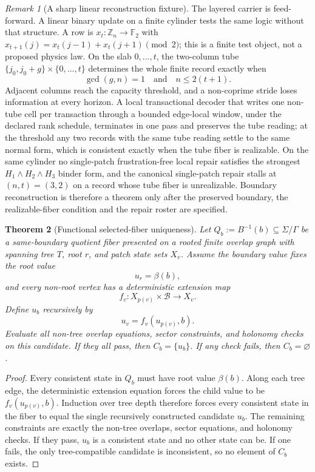 \documentclass[11pt]{article}
\newtheorem{theorem}{Theorem}[section]
\theoremstyle{remark}
\newtheorem{remark}[theorem]{Remark}
\theoremstyle{plain}
\begin{document}
\begin{remark}[A sharp linear reconstruction fixture]
\label{rem:linear-binary-fixture}
The layered carrier is feed-forward. A linear binary update on a finite
cylinder tests the same logic without that structure. A row is
\(x_t:\mathbb Z_n\to\mathbb F_2\) with
\(x_{t+1}(j)=x_t(j-1)+x_t(j+1)\pmod 2\); this is a finite test object, not a
proposed physics law. On the slab \(0,\ldots,t\), the two-column tube
\(\{j_0,j_0+g\}\times\{0,\ldots,t\}\) determines the whole finite record
exactly when
\[
\gcd(g,n)=1\quad\text{and}\quad n\le 2(t+1).
\]
Adjacent columns reach the capacity threshold, and a non-coprime stride
loses information at every horizon. A local transactional decoder that
writes one non-tube cell per transaction through a bounded edge-local
window, under the declared rank schedule, terminates in one pass and
preserves the tube reading; at the threshold any two records with the same
tube reading settle to the same normal form, which is consistent exactly
when the tube fiber is realizable. On the same cylinder no single-patch
frustration-free local repair satisfies the strongest
\(H_1\wedge H_2\wedge H_3\) binder form, and the canonical single-patch
repair stalls at \((n,t)=(3,2)\) on a record whose tube fiber is
unrealizable. Boundary reconstruction is therefore a theorem only after the
preserved boundary, the realizable-fiber condition and the repair roster
are specified.
\end{remark}

\begin{theorem}[Functional selected-fiber uniqueness]\label{thm:functional-selected-fiber}
Let \(Q_b:=B^{-1}(b)\subseteq\Sigma/\Gamma\) be a same-boundary quotient fiber presented on a
rooted finite overlap graph with spanning tree \(T\), root \(r\), and patch state sets \(X_v\).
Assume the boundary value fixes the root value
\[
u_r=\beta(b),
\]
and every non-root vertex has a deterministic extension map
\[
f_v:X_{p(v)}\times\mathcal B\to X_v .
\]
Define \(u_b\) recursively by
\[
u_v=f_v(u_{p(v)},b).
\]
Evaluate all non-tree overlap equations, sector constraints, and holonomy checks on this
candidate. If they all pass, then \(C_b=\{u_b\}\). If any check fails, then \(C_b=\varnothing\).
\end{theorem}

\begin{proof}
Every consistent state in \(Q_b\) must have root value \(\beta(b)\). Along each tree edge, the
deterministic extension equation forces the child value to be
\(f_v(u_{p(v)},b)\). Induction over tree depth therefore forces every consistent state in the
fiber to equal the single recursively constructed candidate \(u_b\). The remaining constraints are
exactly the non-tree overlaps, sector equations, and holonomy checks. If they pass, \(u_b\) is a
consistent state and no other state can be. If one fails, the only tree-compatible candidate is
inconsistent, so no element of \(C_b\) exists.
\end{proof}
\end{document}
